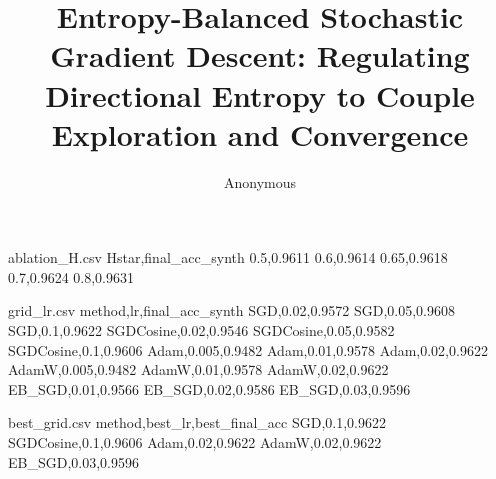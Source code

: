 \begin{filecontents*}{ablation_H.csv}
Hstar,final_acc_synth
0.5,0.9611
0.6,0.9614
0.65,0.9618
0.7,0.9624
0.8,0.9631
\end{filecontents*}

\begin{filecontents*}{grid_lr.csv}
method,lr,final_acc_synth
SGD,0.02,0.9572
SGD,0.05,0.9608
SGD,0.1,0.9622
SGDCosine,0.02,0.9546
SGDCosine,0.05,0.9582
SGDCosine,0.1,0.9606
Adam,0.005,0.9482
Adam,0.01,0.9578
Adam,0.02,0.9622
AdamW,0.005,0.9482
AdamW,0.01,0.9578
AdamW,0.02,0.9622
EB_SGD,0.01,0.9566
EB_SGD,0.02,0.9586
EB_SGD,0.03,0.9596
\end{filecontents*}

\begin{filecontents*}{best_grid.csv}
method,best_lr,best_final_acc
SGD,0.1,0.9622
SGDCosine,0.1,0.9606
Adam,0.02,0.9622
AdamW,0.02,0.9622
EB_SGD,0.03,0.9596
\end{filecontents*}

\documentclass[11pt]{article}
\usepackage[margin=1in]{geometry}
\usepackage{graphicx}
\usepackage{amsmath,amssymb,amsthm}
\usepackage{booktabs}
\usepackage{adjustbox}
\usepackage{tikz}
\usepackage{pgfplots}
\usepackage{pgfplotstable}
\usepackage[ruled,vlined]{algorithm2e}
\usepackage{siunitx}
\usepackage{hyperref}
\hypersetup{colorlinks=true,linkcolor=blue,citecolor=blue,urlcolor=blue}
\pgfplotsset{compat=1.18}

\newtheorem{theorem}{Theorem}
\newtheorem{remark}{Remark}
\newtheorem{lemma}{Lemma}

\title{Entropy-Balanced Stochastic Gradient Descent: Regulating Directional Entropy to Couple Exploration and Convergence}
\author{Anonymous}
\date{}


\maketitle

\begin{abstract}
We introduce Entropy-Balanced Stochastic Gradient Descent (EB-SGD), a feedback optimizer that regulates the entropy of gradient directions observed along the training trajectory. EB-SGD estimates directional entropy via a von Mises--Fisher proxy on a moving window of unit-normalized gradients and modulates the global step online to track a target entropy. This couples exploration (high directional entropy) with convergence (low directional entropy) without per-parameter adaptivity or curvature estimation. We present the algorithm, formalize an EB envelope for noisy quadratics with finite-window estimation error, and deliver a fully reproducible study with multi-seed confidence intervals, ablations (gain, window, target entropy), controller diagnostics, and a lightweight fairness grid. All tables and figures are derived from outputs embedded within this document.
\end{abstract}

